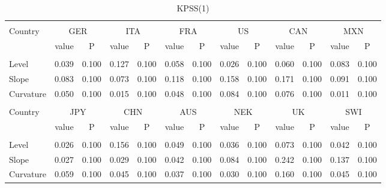 \documentclass{article}
\begin{document}

\begin{table}[h]
\caption{KPSS(1)} %
\fontsize{10}{10}\selectfont
\centering%
\begin{tabular}{l cc cc cc cc cc cc}%
\hline\hline \\ [-1.5ex]                         %

Country	&	\multicolumn{2}{c}{GER}			&	\multicolumn{2}{c}{ITA}			&	\multicolumn{2}{c}{FRA}			&	\multicolumn{2}{c}{US}			&	\multicolumn{2}{c}{CAN}			&	\multicolumn{2}{c}{MXN}			\\[0.5ex] 

 & value &P & value &P& value &P & value &P& value &P & value &P\\

\hline       \\ [-1.5ex] 

Level	&	0.039	&	0.100	&	0.127	&	0.100	&	0.058	&	0.100	&	0.026	&	0.100	&	0.060	&	0.100	&	0.083	&	0.100	\\
Slope	&	0.083	&	0.100	&	0.073	&	0.100	&	0.118	&	0.100	&	0.158	&	0.100	&	0.171	&	0.100	&	0.091	&	0.100	\\
Curvature	&	0.050	&	0.100	&	0.015	&	0.100	&	0.048	&	0.100	&	0.084	&	0.100	&	0.076	&	0.100	&	0.011	&	0.100	\\


\hline\hline   \\ [-1.5ex]    

Country	&	\multicolumn{2}{c}{JPY}			&	\multicolumn{2}{c}{CHN}			&	\multicolumn{2}{c}{AUS}			&	\multicolumn{2}{c}{NEK}			&	\multicolumn{2}{c}{UK}			&	\multicolumn{2}{c}{SWI}			\\

 & value &P & value &P& value &P & value &P& value &P & value &P\\

\hline       \\ [-1.5ex] 

Level	&	0.026	&	0.100	&	0.156	&	0.100	&	0.049	&	0.100	&	0.036	&	0.100	&	0.073	&	0.100	&	0.042	&	0.100	\\
Slope	&	0.027	&	0.100	&	0.029	&	0.100	&	0.042	&	0.100	&	0.084	&	0.100	&	0.242	&	0.100	&	0.137	&	0.100	\\
Curvature	&	0.059	&	0.100	&	0.045	&	0.100	&	0.037	&	0.100	&	0.030	&	0.100	&	0.160	&	0.100	&	0.045	&	0.100	\\


\hline            
\end{tabular}
\label{table:nonlin}%
\end{table}
\end{document}
